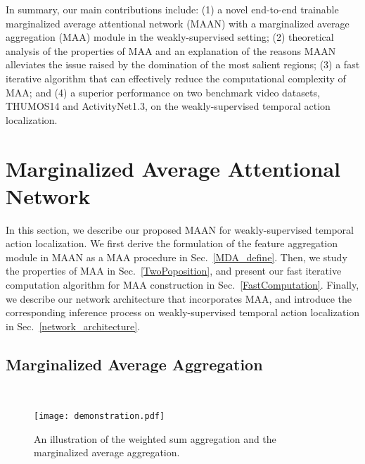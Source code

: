 \documentclass{article} \usepackage{iclr2019_conference,times}
\begin{document}
In summary, our main contributions include: (1) a novel end-to-end trainable marginalized average attentional network (MAAN) with a marginalized average aggregation (MAA) module in the weakly-supervised setting; (2) theoretical analysis of the properties of MAA and an explanation of the reasons MAAN alleviates the issue raised by the domination of the most salient regions; (3) a fast iterative algorithm that can effectively reduce the computational complexity of MAA; and (4) a superior performance on two benchmark video datasets, THUMOS14 and ActivityNet1.3, on the weakly-supervised temporal action localization.




















\section{Marginalized Average Attentional Network}
In this section, we describe our proposed MAAN for weakly-supervised temporal action localization.  We first derive the formulation of the feature aggregation module in MAAN as a MAA procedure in Sec.~\ref{MDA_define}. Then, we study the properties of MAA in Sec.~\ref{TwoPoposition}, and present our fast iterative computation algorithm for MAA construction in Sec.~\ref{FastComputation}. Finally, we describe our network architecture that incorporates MAA,
and introduce the corresponding inference process on weakly-supervised temporal action localization in Sec.~\ref{network_architecture}. 




\subsection{Marginalized Average Aggregation}~\label{MDA_define}

\vspace{-4mm}

  \begin{figure}[!t]
  	\begin{center}
  		\texttt{[image: demonstration.pdf]}
  		\caption{{An illustration of the weighted sum aggregation and the marginalized average aggregation.}}
  		\label{fig:demonstration}
  		\vspace{-4mm}
  	\end{center}
  \end{figure}
\end{document}
